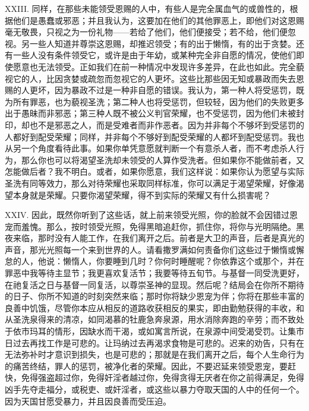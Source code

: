 XXIII. 同样，在那些未能领受恩赐的人中，有些人是完全属血气的或兽性的，根据他们是愚蠢或邪恶；并且我认为，这要加在他们的其他罪恶上，即他们对这恩赐毫无敬畏，只视之为一份礼物——若给了他们，他们便接受；若不给，他们便忽视。另一些人知道并尊崇这恩赐，却推迟领受；有的出于懒惰，有的出于贪婪。还有一些人没有条件领受它，或许是由于年幼，或某种完全非自愿的情况，使他们即使愿意也无法领受。正如我们在前一种情况中发现许多差异，在此也如此。完全藐视它的人，比因贪婪或疏忽而忽视它的人更坏。这些比那些因无知或暴政而失去恩赐的人更坏，因为暴政不过是一种非自愿的错误。我认为，第一种人将受惩罚，既为所有罪恶，也为藐视圣洗；第二种人也将受惩罚，但较轻，因为他们的失败更多出于愚昧而非邪恶；第三种人既不被公义判官荣耀，也不受惩罚，因为他们未被封印，却也不是邪恶之人，而是受难者而非作恶者。因为并非每个不够坏到受惩罚的人都好到配受荣耀；同样，并非每个不够好到配受荣耀的人都坏到配受惩罚。我也从另一个角度看待此事。如果你单凭意愿就判断一个有意杀人者，而不考虑杀人行为，那么你也可以将渴望圣洗却未领受的人算作受洗者。但如果你不能做前者，又怎能做后者？我不明白。或者，如果你愿意，我们这样说：如果你认为愿望与实际圣洗有同等效力，那么对待荣耀也采取同样标准，你可以满足于渴望荣耀，好像渴望本身就是荣耀。只要你渴望荣耀，得不到实际的荣耀又有什么损害呢？\par

XXIV. 因此，既然你听到了这些话，就上前来领受光照，你的脸就不会因错过恩宠而羞愧。那么，按时领受光照，免得黑暗追赶你，抓住你，将你与光明隔绝。黑夜来临，那时没有人能工作，在我们离开之后。前者是大卫的声音，后者是真光的声音，那光光照每一个来到世界的人。请看撒罗满如何责备你们这些过于懒惰或懈怠的人，他说：懒惰人，你要睡到几时？你何时睡醒呢？你依靠这个或那个，并在罪恶中我等待主显节；我更喜欢复活节；我要等待五旬节。与基督一同受洗更好，在祂复活之日与基督一同复活，以尊崇圣神的显现。然后呢？结局会在你所不期待的日子、你所不知道的时刻突然来临；那时你将缺少恩宠为伴；你将在那些丰富的良善中饥饿，尽管你本应从相反的道路收获相反的果实，即由勤勉获得的丰收，和从圣洗泉得来的清凉，如同渴慕的牡鹿急奔泉源，用水消除奔跑的辛劳；而不致处于依市玛耳的情形，因缺水而干渴，或如寓言所说，在泉源中间受渴受罚。让集市日过去再找工作是可悲的。让玛纳过去再渴求食物是可悲的。迟来的劝告，只有在无法弥补时才意识到损失，也是可悲的；那就是在我们离开之后，每个人生命行为的痛苦终结，罪人的惩罚，被净化者的荣耀。因此，不要迟延来领受恩宠，要赶快，免得强盗超过你，免得奸淫者越过你，免得贪得无厌者在你之前得满足，免得凶手先夺走福分，或税吏、或奸淫者，或这些以暴力夺取天国的人中的任何一个。因为天国甘愿受暴力，并且因良善而受压迫。\par

